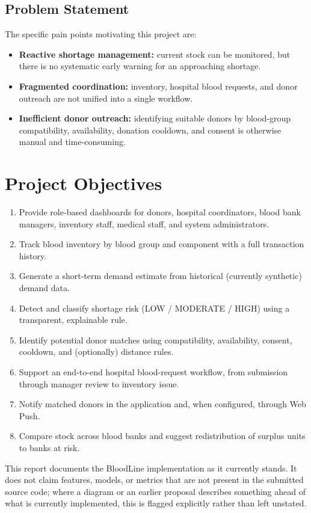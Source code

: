 \documentclass[12pt,a4paper,twoside]{report}
\begin{document}
\subsection{Problem Statement}
The specific pain points motivating this project are:
\begin{itemize}
\item \textbf{Reactive shortage management:} current stock can be monitored, but there is no systematic early warning for an approaching shortage.
\item \textbf{Fragmented coordination:} inventory, hospital blood requests, and donor outreach are not unified into a single workflow.
\item \textbf{Inefficient donor outreach:} identifying suitable donors by blood-group compatibility, availability, donation cooldown, and consent is otherwise manual and time-consuming.
\end{itemize}

\section{Project Objectives}
\begin{enumerate}
\item Provide role-based dashboards for donors, hospital coordinators, blood bank managers, inventory staff, medical staff, and system administrators.
\item Track blood inventory by blood group and component with a full transaction history.
\item Generate a short-term demand estimate from historical (currently synthetic) demand data.
\item Detect and classify shortage risk (LOW / MODERATE / HIGH) using a transparent, explainable rule.
\item Identify potential donor matches using compatibility, availability, consent, cooldown, and (optionally) distance rules.
\item Support an end-to-end hospital blood-request workflow, from submission through manager review to inventory issue.
\item Notify matched donors in the application and, when configured, through Web Push.
\item Compare stock across blood banks and suggest redistribution of surplus units to banks at risk.
\end{enumerate}
This report documents the BloodLine implementation as it currently stands. It does not claim features, models, or metrics that are not present in the submitted source code; where a diagram or an earlier proposal describes something ahead of what is currently implemented, this is flagged explicitly rather than left unstated.
\end{document}
